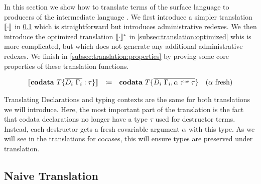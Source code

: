 In this section we show how to translate terms of the surface language \surfacelang{} to producers of the intermediate language \targetlang.
We first introduce a simpler translation $\llbracket \cdot \rrbracket$ in \cref{subsec:translation:naive} which is straightforward but introduces administrative redexes.
We then introduce the optimized translation $\llbracket \cdot \rrbracket_{}^{\ast}$ in \cref{subsec:translation:optimized} whis is more complicated, but which does not generate 
any additional administrative redexes.
We finish in \cref{subsec:translation:properties} by proving some core properties of these translation functions.

\[
  \begin{array}{rcll}
    \translate{\mathbf{codata}\ T \{ \overline{D_i\ \Gamma_i} : \tau \}}{} & \coloneq & \mathbf{codata}\ T \{ \overline{D_i\ \Gamma_i,\alpha\cnt\tau}\} & \fresh{\alpha}\\
  \end{array}
\]

Translating Declarations and typing contexts are the same for both translations we will introduce. 
Here, the most important part of the translation is the fact that codata declarations no longer have a type $\tau$ used for destructor terms.
Instead, each destructor gets a fresh covariable argument $\alpha$ with this type.
As we will see in the translations for cocases, this will ensure types are preserved under translation.

\subsection{Naive Translation}
\label{subsec:translation:naive}

